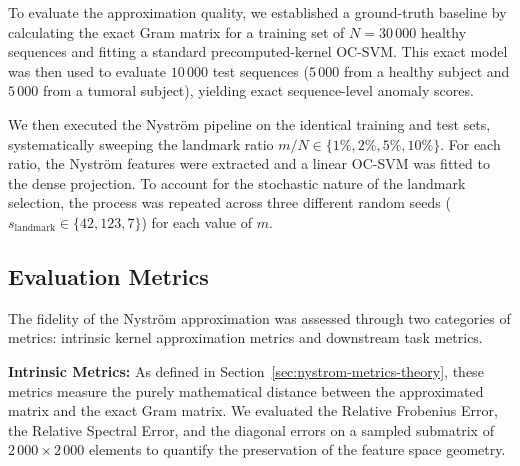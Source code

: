 To evaluate the approximation quality, we established a ground-truth baseline by calculating the exact Gram matrix for a training set of $N = 30\,000$ healthy sequences and fitting a standard precomputed-kernel OC-SVM. 
This exact model was then used to evaluate $10\,000$ test sequences ($5\,000$ from a healthy subject and $5\,000$ from a tumoral subject), yielding exact sequence-level anomaly scores.

We then executed the Nystr\"{o}m pipeline on the identical training and test sets, systematically sweeping the landmark ratio $m/N \in \{1\%, 2\%, 5\%, 10\%\}$. For each ratio, the Nystr\"{o}m features were extracted and a linear OC-SVM was fitted to the dense projection. 
To account for the stochastic nature of the landmark selection, the process was repeated across three different random seeds ($s_{\text{landmark}} \in \{42, 123, 7\}$) for each value of $m$.

\subsection{Evaluation Metrics}\label{sec:nystrom-metrics}

The fidelity of the Nystr\"{o}m approximation was assessed through two categories of metrics: intrinsic kernel approximation metrics and downstream task metrics.

\textbf{Intrinsic Metrics:} As defined in Section~\ref{sec:nystrom-metrics-theory}, these metrics measure the purely mathematical distance between the approximated matrix and the exact Gram matrix. We evaluated the Relative Frobenius Error, the Relative Spectral Error, and the diagonal errors on a sampled submatrix of $2\,000 \times 2\,000$ elements to quantify the preservation of the feature space geometry.

